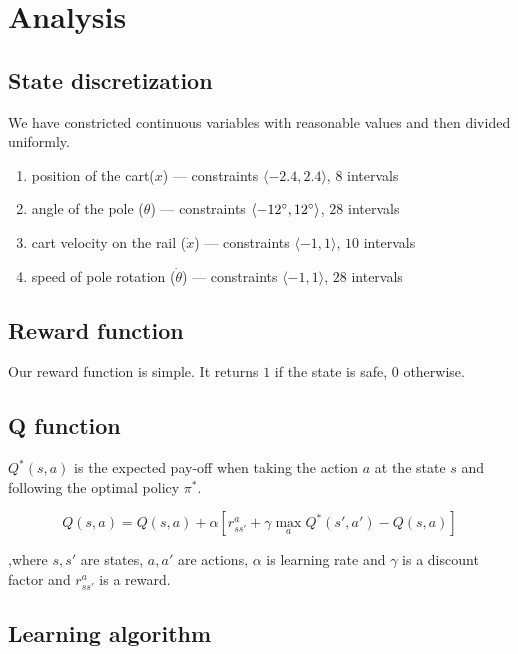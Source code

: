 \documentclass[12pt,a4paper]{article}
\begin{document}
\newpage

\section{Analysis}

\subsection{State discretization}

We have constricted continuous variables with reasonable values and then divided uniformly.

\begin{enumerate}

	\item position of the cart($x$) --- constraints $\langle-2.4, 2.4\rangle$, $8$ intervals
	\item angle of the pole ($\theta$) --- constraints $\langle-12\degree, 12\degree\rangle$, $28$ intervals
	\item cart velocity on the rail ($\dot x$) --- constraints $\langle-1, 1\rangle$, $10$ intervals
	\item speed of pole rotation ($\dot \theta$) --- constraints $\langle-1, 1\rangle$, $28$ intervals

\end{enumerate}


\subsection{Reward function}

Our reward function is simple. It returns $1$ if the state is safe, $0$ otherwise.


\subsection{Q function}

$Q^*(s,a)$ is the expected pay-off when taking the action $a$ at the state $s$ and following the optimal policy $\pi^*$.

$$
Q(s,a) = Q(s,a) + \alpha[r^a_{ss'} + \gamma \max_{a}Q^*(s',a') - Q(s,a)]
$$

\noindent
,where $s, s'$ are states, $a,a'$ are actions, $\alpha$ is learning rate and $\gamma$ is a discount factor and $r^a_{ss'}$ is a reward.

\subsection{Learning algorithm}
\end{document}
